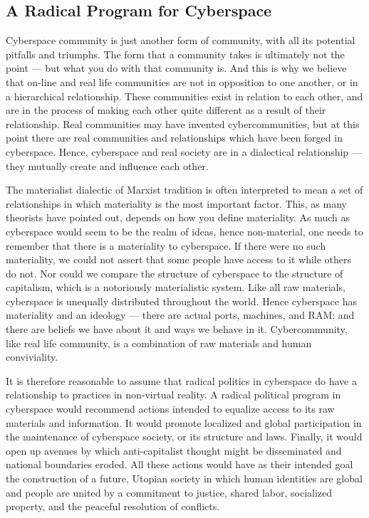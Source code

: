 \documentclass[letterpaper,12pt,english]{sphinxmanual}
\begin{document}
\subsection{A Radical Program for Cyberspace}
\label{1995:a-radical-program-for-cyberspace}
Cyberspace community is just another form of community, with all its potential pitfalls and triumphs. The form that a community takes is ultimately not the point — but what you do with that community is. And this is why we believe that on-line and real life communities are not in opposition to one another, or in a hierarchical relationship. These communities exist in relation to each other, and are in the process of making each other quite different as a result of their relationship. Real communities may have invented cybercommunities, but at this point there are real communities and relationships which have been forged in cyberspace. Hence, cyberspace and real society are in a dialectical relationship — they mutually create and influence each other.

The materialist dialectic of Marxist tradition is often interpreted to mean a set of relationships in which materiality is the most important factor. This, as many theorists have pointed out, depends on how you define materiality. As much as cyberspace would seem to be the realm of ideas, hence non-material, one needs to remember that there is a materiality to cyberspace. If there were no such materiality, we could not assert that some people have access to it while others do not. Nor could we compare the structure of cyberspace to the structure of capitalism, which is a notoriously materialistic system. Like all raw materials, cyberspace is unequally distributed throughout the world. Hence cyberspace has materiality and an ideology — there are actual ports, machines, and RAM; and there are beliefs we have about it and ways we behave in it. Cybercommunity, like real life community, is a combination of raw materials and human conviviality.

It is therefore reasonable to assume that radical politics in cyberspace do have a relationship to practices in non-virtual reality. A radical political program in cyberspace would recommend actions intended to equalize access to its raw materials and information. It would promote localized and global participation in the maintenance of cyberspace society, or its structure and laws. Finally, it would open up avenues by which anti-capitalist thought might be disseminated and national boundaries eroded. All these actions would have as their intended goal the construction of a future, Utopian society in which human identities are global and people are united by a commitment to justice, shared labor, socialized property, and the peaceful resolution of conflicts.
\end{document}
